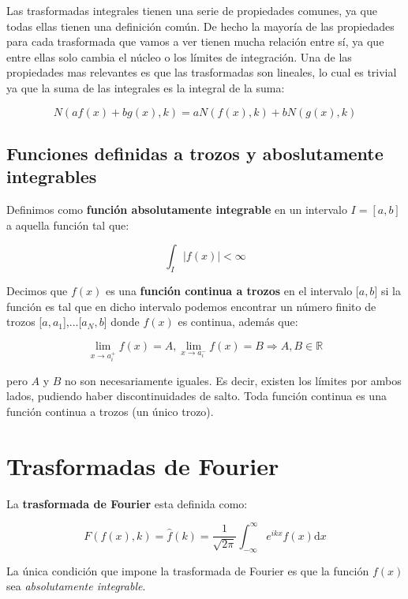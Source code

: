 \documentclass[12pt,a4paper]{book}
\newcommand{\D}{\mathrm{d}}
\newcommand{\inti}{\int_{-\infty}^{\infty}}
\newcommand{\hatf}{\widehat{f}}
\begin{document}
Las trasformadas integrales tienen una serie de propiedades comunes, ya que todas ellas tienen una definición común. De hecho la mayoría de las propiedades para cada trasformada que vamos a ver tienen mucha relación entre sí, ya que entre ellas solo cambia el núcleo o los límites de integración. Una de las propiedades mas relevantes es que las trasformadas son lineales, lo cual es trivial ya que la suma de las integrales es la integral de la suma:

\begin{equation}
N(a f(x) + b g(x),k) = a N(f(x),k) + b N(g(x),k)
\end{equation}


\subsection{Funciones definidas a trozos y aboslutamente integrables}

Definimos como \textbf{función absolutamente integrable} en un intervalo $I=[a,b]$ a aquella función tal que:

\begin{equation}
\int_I |f(x)| < \infty
\end{equation}

Decimos que $f(x)$ es una \textbf{función continua a trozos} en el intervalo [$a,b$] si la función es tal que en dicho intervalo podemos encontrar un número finito de trozos [$a,a_1$],...[$a_N,b$] donde $f(x)$ es continua, además que:


$$ \lim_{x \rightarrow a_i^+} f(x) = A, \lim_{x \rightarrow a_i^-} f(x) = B \Longrightarrow A,B \in \mathbb{R}   $$

pero $A$ y $B$ no son necesariamente iguales. Es decir, existen los límites por ambos lados, pudiendo haber discontinuidades de salto. Toda función continua es una función continua a trozos (un único trozo).

\section{Trasformadas de Fourier}

La \textbf{trasformada de Fourier} esta definida como:

\begin{equation}
F(f(x),k) = \hatf(k) = \dfrac{1}{\sqrt{2 \pi}} \inti e^{ikx} f(x) \D x
\end{equation}

La única condición que impone la trasformada de Fourier es que la función $f(x)$ sea \textit{absolutamente integrable}. \\
\end{document}
